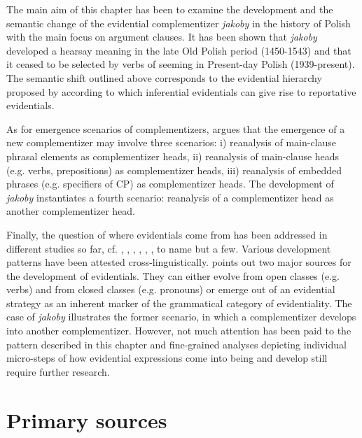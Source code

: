\documentclass[output=paper
,modfonts
,nonflat]{langsci/langscibook}
\begin{document}
The main aim of this chapter has been to examine the development and the semantic change of the evidential complementizer \emph{jakoby} in the history of Polish with the main focus on argument clauses. It has been shown that \emph{jakoby} developed a hearsay meaning in the late Old Polish period (1450-1543) and that it  ceased to be selected by verbs of seeming in Present-day Polish (1939-present). The semantic shift outlined above corresponds to the evidential hierarchy proposed by \textcite{Haan1999} according to which inferential evidentials can give rise to reportative evidentials.     

As for emergence scenarios of complementizers, \textcite[433]{Willis2007} argues that the emergence of a new complementizer may involve three scenarios: i) reanalysis of main-clause phrasal elements as complementizer heads, ii) reanalysis of main-clause heads (e.g. verbs, prepositions) as complementizer heads, iii) reanalysis of embedded phrases (e.g. specifiers of CP) as complementizer heads. The development of \emph{jakoby} instantiates a fourth scenario: reanalysis of a complementizer head as another complementizer head. 

Finally, the question of where evidentials come from has been addressed in different studies so far, cf. \textcite{Willett1988}, \textcite{Lazard2001}, \textcite[271-302]{Aikhenvald2004}, \textcite{Aikhenvald2011}, \textcite{Jalava2017}, \textcite{Friedman2018}, to name but a few. Various development patterns have been attested cross-linguistically. \textcite{Aikhenvald2011} points out two major sources for the development of evidentials. They can either evolve from open classes (e.g. verbs) and from closed classes (e.g. pronouns) or emerge out of an evidential  strategy as an inherent marker of the grammatical category of evidentiality. The case of \emph{jakoby} illustrates the former scenario, in which a complementizer develops into another complementizer. However, not much attention has been paid to the pattern described in this chapter and fine-grained analyses depicting individual micro-steps of how evidential expressions come into being and develop still require further research.      

\section*{Primary sources}
\end{document}
